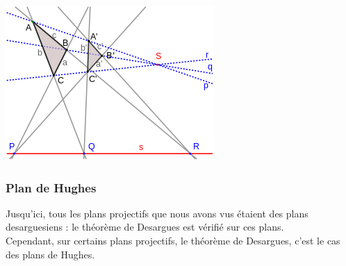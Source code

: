\documentclass[a4paper]{article}
\begin{document}
\begin{center}
\includegraphics[scale=0.6]{desargues.png}  
\end{center}

\subsubsection{Plan de Hughes}
Jusqu'ici, tous les plans projectifs que nous avons vus étaient des plans desarguesiens : le théorème de Desargues est vérifié sur ces plans.\\
Cependant, sur certains plans projectifs, le théorème de Desargues, c'est le cas des plans de Hughes.\vspace{1\baselineskip}\\
\end{document}
